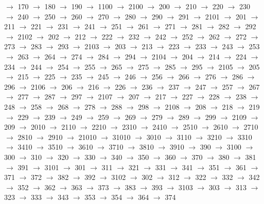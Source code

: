 $\rightarrow$ 170 $\rightarrow$ 180 $\rightarrow$ 190 $\rightarrow$ 1100 $\rightarrow$ 2100 $\rightarrow$ 200 $\rightarrow$ 210 $\rightarrow$ 220 $\rightarrow$ 230 $\rightarrow$ 240 $\rightarrow$ 250 $\rightarrow$ 260 $\rightarrow$ 270 $\rightarrow$ 280 $\rightarrow$ 290 $\rightarrow$ 291 $\rightarrow$ 2101 $\rightarrow$ 201 $\rightarrow$ 211 $\rightarrow$ 221 $\rightarrow$ 231 $\rightarrow$ 241 $\rightarrow$ 251 $\rightarrow$ 261 $\rightarrow$ 271 $\rightarrow$ 281 $\rightarrow$ 282 $\rightarrow$ 292 $\rightarrow$ 2102 $\rightarrow$ 202 $\rightarrow$ 212 $\rightarrow$ 222 $\rightarrow$ 232 $\rightarrow$ 242 $\rightarrow$ 252 $\rightarrow$ 262 $\rightarrow$ 272 $\rightarrow$ 273 $\rightarrow$ 283 $\rightarrow$ 293 $\rightarrow$ 2103 $\rightarrow$ 203 $\rightarrow$ 213 $\rightarrow$ 223 $\rightarrow$ 233 $\rightarrow$ 243 $\rightarrow$ 253 $\rightarrow$ 263 $\rightarrow$ 264 $\rightarrow$ 274 $\rightarrow$ 284 $\rightarrow$ 294 $\rightarrow$ 2104 $\rightarrow$ 204 $\rightarrow$ 214 $\rightarrow$ 224 $\rightarrow$ 234 $\rightarrow$ 244 $\rightarrow$ 254 $\rightarrow$ 255 $\rightarrow$ 265 $\rightarrow$ 275 $\rightarrow$ 285 $\rightarrow$ 295 $\rightarrow$ 2105 $\rightarrow$ 205 $\rightarrow$ 215 $\rightarrow$ 225 $\rightarrow$ 235 $\rightarrow$ 245 $\rightarrow$ 246 $\rightarrow$ 256 $\rightarrow$ 266 $\rightarrow$ 276 $\rightarrow$ 286 $\rightarrow$ 296 $\rightarrow$ 2106 $\rightarrow$ 206 $\rightarrow$ 216 $\rightarrow$ 226 $\rightarrow$ 236 $\rightarrow$ 237 $\rightarrow$ 247 $\rightarrow$ 257 $\rightarrow$ 267 $\rightarrow$ 277 $\rightarrow$ 287 $\rightarrow$ 297 $\rightarrow$ 2107 $\rightarrow$ 207 $\rightarrow$ 217 $\rightarrow$ 227 $\rightarrow$ 228 $\rightarrow$ 238 $\rightarrow$ 248 $\rightarrow$ 258 $\rightarrow$ 268 $\rightarrow$ 278 $\rightarrow$ 288 $\rightarrow$ 298 $\rightarrow$ 2108 $\rightarrow$ 208 $\rightarrow$ 218 $\rightarrow$ 219 $\rightarrow$ 229 $\rightarrow$ 239 $\rightarrow$ 249 $\rightarrow$ 259 $\rightarrow$ 269 $\rightarrow$ 279 $\rightarrow$ 289 $\rightarrow$ 299 $\rightarrow$ 2109 $\rightarrow$ 209 $\rightarrow$ 2010 $\rightarrow$ 2110 $\rightarrow$ 2210 $\rightarrow$ 2310 $\rightarrow$ 2410 $\rightarrow$ 2510 $\rightarrow$ 2610 $\rightarrow$ 2710 $\rightarrow$ 2810 $\rightarrow$ 2910 $\rightarrow$ 21010 $\rightarrow$ 31010 $\rightarrow$ 3010 $\rightarrow$ 3110 $\rightarrow$ 3210 $\rightarrow$ 3310 $\rightarrow$ 3410 $\rightarrow$ 3510 $\rightarrow$ 3610 $\rightarrow$ 3710 $\rightarrow$ 3810 $\rightarrow$ 3910 $\rightarrow$ 390 $\rightarrow$ 3100 $\rightarrow$ 300 $\rightarrow$ 310 $\rightarrow$ 320 $\rightarrow$ 330 $\rightarrow$ 340 $\rightarrow$ 350 $\rightarrow$ 360 $\rightarrow$ 370 $\rightarrow$ 380 $\rightarrow$ 381 $\rightarrow$ 391 $\rightarrow$ 3101 $\rightarrow$ 301 $\rightarrow$ 311 $\rightarrow$ 321 $\rightarrow$ 331 $\rightarrow$ 341 $\rightarrow$ 351 $\rightarrow$ 361 $\rightarrow$ 371 $\rightarrow$ 372 $\rightarrow$ 382 $\rightarrow$ 392 $\rightarrow$ 3102 $\rightarrow$ 302 $\rightarrow$ 312 $\rightarrow$ 322 $\rightarrow$ 332 $\rightarrow$ 342 $\rightarrow$ 352 $\rightarrow$ 362 $\rightarrow$ 363 $\rightarrow$ 373 $\rightarrow$ 383 $\rightarrow$ 393 $\rightarrow$ 3103 $\rightarrow$ 303 $\rightarrow$ 313 $\rightarrow$ 323 $\rightarrow$ 333 $\rightarrow$ 343 $\rightarrow$ 353 $\rightarrow$ 354 $\rightarrow$ 364 $\rightarrow$ 374 